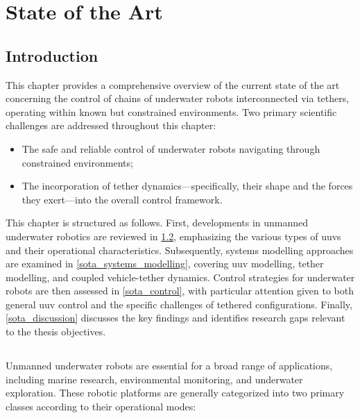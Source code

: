 \chapter{State of the Art}
\label{state_of_the_art}

\minitoc{}

\section{Introduction}
\label{sota_introduction}

This chapter provides a comprehensive overview of the current state of the art concerning the
control of chains of underwater robots interconnected via tethers, operating within known but
constrained environments. Two primary scientific challenges are addressed throughout this chapter:

\begin{itemize}
	\item The safe and reliable control of underwater robots navigating through constrained environments;
	\item The incorporation of tether dynamics—specifically, their shape and the forces they exert—into the
	      overall control framework.
\end{itemize}

This chapter is structured as follows. First, developments in unmanned underwater robotics are
reviewed in \cref{sota_unmanned_underwater_robots}, emphasizing the various types of \acp{uuv} and
their operational characteristics. Subsequently, systems modelling approaches are examined in
\cref{sota_systems_modelling}, covering \ac{uuv} modelling, tether modelling, and coupled
vehicle-tether dynamics. Control strategies for underwater robots are then assessed in
\cref{sota_control}, with particular attention given to both general \ac{uuv} control and the
specific challenges of tethered configurations. Finally, \cref{sota_discussion} discusses the key
findings and identifies research gaps relevant to the thesis objectives.

\section{}
\label{sota_unmanned_underwater_robots}

Unmanned underwater robots are essential for a broad range of applications, including marine
research, environmental monitoring, and underwater exploration. These robotic platforms are
generally categorized into two primary classes according to their operational modes:

